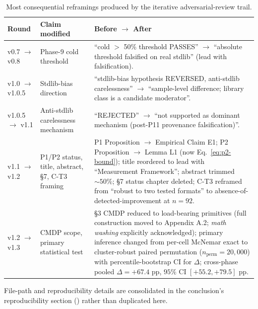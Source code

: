 \begin{table}[h]
\centering
\small
\caption{Most consequential reframings produced by the iterative adversarial-review trail.}
\label{tab:peer-review-trail}
\begin{tabularx}{\linewidth}{@{}llX@{}}
\toprule
\textbf{Round} & \textbf{Claim modified} & \textbf{Before $\to$ After} \\
\midrule
v0.7 $\to$ v0.8 & Phase-9 cold threshold & ``cold $>$ 50\% threshold PASSES'' $\to$ ``absolute threshold falsified on real stdlib'' (lead with falsification). \\
\addlinespace
v1.0 $\to$ v1.0.5 & Stdlib-bias direction & ``stdlib-bias hypothesis REVERSED, anti-stdlib carelessness'' $\to$ ``sample-level difference; library class is a candidate moderator''. \\
\addlinespace
v1.0.5 $\to$ v1.1 & Anti-stdlib carelessness mechanism & ``REJECTED'' $\to$ ``not supported as dominant mechanism (post-P11 provenance falsification)''. \\
\addlinespace
v1.1 $\to$ v1.2 & P1/P2 status, title, abstract, \S7, C-T3 framing & P1 Proposition $\to$ Empirical Claim E1; P2 Proposition $\to$ Lemma L1 (now Eq.~\ref{eq:p2-bound}); title reordered to lead with ``Measurement Framework''; abstract trimmed $\sim 50\%$; \S7 status chapter deleted; C-T3 reframed from ``robust to two tested formats'' to absence-of-detected-improvement at $n=92$. \\
\addlinespace
v1.2 $\to$ v1.3 & CMDP scope, primary statistical test & \S3 CMDP reduced to load-bearing primitives (full construction moved to Appendix A.2; \emph{math washing} explicitly acknowledged); primary inference changed from per-cell McNemar exact to cluster-robust paired permutation ($n_{\text{perm}} = 20{,}000$) with percentile-bootstrap CI for $\Delta$; cross-phase pooled $\Delta = +67.4$ pp, $95\%$ CI $[+55.2, +79.5]$ pp. \\
\bottomrule
\end{tabularx}
\end{table}

File-path and reproducibility details are consolidated in the conclusion's reproducibility section () rather than duplicated here.
